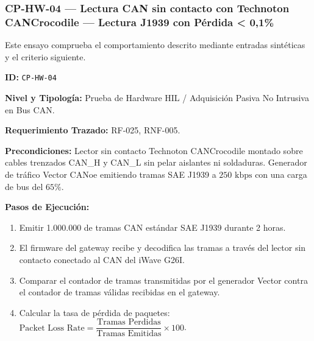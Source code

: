 \subsubsection*{CP-HW-04 — Lectura CAN sin contacto con Technoton CANCrocodile — Lectura J1939 con Pérdida < 0{,}1\%}\label{sec:9-cp-hw-04}
Este ensayo comprueba el comportamiento descrito mediante entradas sintéticas y el criterio siguiente.

\par\noindent \textbf{ID:} \texttt{CP-\allowbreak{}HW-\allowbreak{}04}\par
\par\noindent \textbf{Nivel y Tipología:} Prueba de Hardware HIL / Adquisición Pasiva No Intrusiva en Bus CAN.\par
\par\noindent \textbf{Requerimiento Trazado:} RF-025, RNF-005.\par
\par\noindent \textbf{Precondiciones:} Lector sin contacto Technoton CANCrocodile montado sobre cables trenzados CAN\_H y CAN\_L sin pelar aislantes ni soldaduras. Generador de tráfico Vector CANoe emitiendo tramas SAE J1939 a \(250\text{ kbps}\) con una carga de bus del \(65\%\).\par
\par\noindent \textbf{Pasos de Ejecución:}\par
\begin{enumerate}
\item Emitir 1.000.000 de tramas CAN estándar SAE J1939 durante 2 horas.
\item El firmware del gateway recibe y decodifica las tramas a través del lector sin contacto conectado al CAN del iWave G26I.
\item Comparar el contador de tramas transmitidas por el generador Vector contra el contador de tramas válidas recibidas en el gateway.
\item Calcular la tasa de pérdida de paquetes: $\text{Packet Loss Rate} = \dfrac{\text{Tramas Perdidas}}{\text{Tramas Emitidas}} \times 100$.
\end{enumerate}

